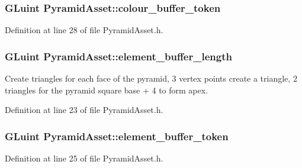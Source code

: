 \subsubsection[{colour\+\_\+buffer\+\_\+token}]{\setlength{\rightskip}{0pt plus 5cm}G\+Luint Pyramid\+Asset\+::colour\+\_\+buffer\+\_\+token\hspace{0.3cm}{\ttfamily [private]}}\label{class_pyramid_asset_a1c82b429f52d92feefacb5755017aec0}


Definition at line 28 of file Pyramid\+Asset.\+h.

\hypertarget{class_pyramid_asset_a5566105859271b493eab3b5f9c02f866}{}
\subsubsection[{element\+\_\+buffer\+\_\+length}]{\setlength{\rightskip}{0pt plus 5cm}G\+Luint Pyramid\+Asset\+::element\+\_\+buffer\+\_\+length\hspace{0.3cm}{\ttfamily [private]}}\label{class_pyramid_asset_a5566105859271b493eab3b5f9c02f866}
Create triangles for each face of the pyramid, 3 vertex points create a triangle, 2 triangles for the pyramid square base + 4 to form apex. 

Definition at line 23 of file Pyramid\+Asset.\+h.

\hypertarget{class_pyramid_asset_a6f7e2f50904d2941e33df8eb7f5f9c2d}{}
\subsubsection[{element\+\_\+buffer\+\_\+token}]{\setlength{\rightskip}{0pt plus 5cm}G\+Luint Pyramid\+Asset\+::element\+\_\+buffer\+\_\+token\hspace{0.3cm}{\ttfamily [private]}}\label{class_pyramid_asset_a6f7e2f50904d2941e33df8eb7f5f9c2d}


Definition at line 25 of file Pyramid\+Asset.\+h.

\hypertarget{class_pyramid_asset_a54d9cec42bc77d07a66e6c1cd55049b0}{}

